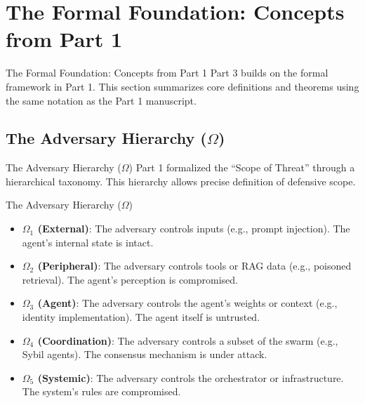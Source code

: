 \documentclass[
  ignorenonframetext,
]{beamer}
\author{\texorpdfstring{}{}}
\date{}
\providecommand{\tightlist}{%
  \setlength{\itemsep}{0pt}\setlength{\parskip}{0pt}}
\begin{document}
\section{The Formal Foundation: Concepts from Part
1}\label{sec:theory-review}

\begin{frame}[allowframebreaks]{The Formal Foundation: Concepts from
Part 1}
Part 3 builds on the formal framework in Part 1. This section summarizes
core definitions and theorems using the same notation as the Part 1
manuscript.
\end{frame}

\subsection{\texorpdfstring{The Adversary Hierarchy
(\(\Omega\))}{The Adversary Hierarchy (\textbackslash Omega)}}\label{sec:adversary-hierarchy}

\begin{frame}[allowframebreaks]{The Adversary Hierarchy (\(\Omega\))}
Part 1 formalized the ``Scope of Threat'' through a hierarchical
taxonomy. This hierarchy allows precise definition of defensive scope.

\end{frame}

\begin{frame}[allowframebreaks]{The Adversary Hierarchy (\(\Omega\))}
\begin{itemize}
\tightlist
\item
  \textbf{\(\Omega_1\) (External)}: The adversary controls inputs (e.g.,
  prompt injection). The agent's internal state is intact.
\item
  \textbf{\(\Omega_2\) (Peripheral)}: The adversary controls tools or
  RAG data (e.g., poisoned retrieval). The agent's perception is
  compromised.
\item
  \textbf{\(\Omega_3\) (Agent)}: The adversary controls the agent's
  weights or context (e.g., identity implementation). The agent itself
  is untrusted.
\item
  \textbf{\(\Omega_4\) (Coordination)}: The adversary controls a subset
  of the swarm (e.g., Sybil agents). The consensus mechanism is under
  attack.
\item
  \textbf{\(\Omega_5\) (Systemic)}: The adversary controls the
  orchestrator or infrastructure. The system's rules are compromised.
\end{itemize}

\end{frame}
\end{document}
